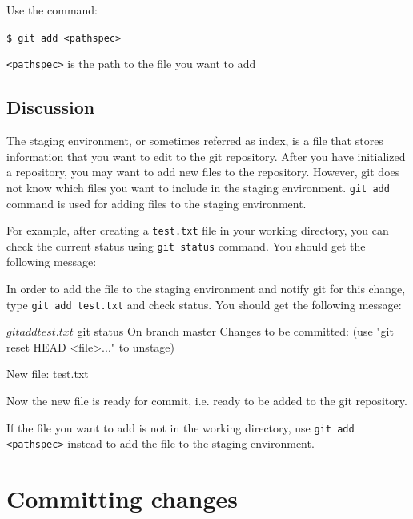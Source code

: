 \documentclass[12pt]{report}
\newcommand\code[1]{{\color{blue}\texttt{#1}}}
\begin{document}
Use the command:

\code{\$ git add <pathspec>}

\code{<pathspec>} is the path to the file you want to add

\subsection*{Discussion}

The staging environment, or sometimes referred as index, is a file that stores information that you want to edit to the git repository. After you have initialized a repository, you may want to add new files to the repository. However, git does not know which files you want to include in the staging environment. \code{git add} command is used for adding files to the staging environment.

For example, after creating a \texttt{test.txt} file in your working directory, you can check the current status using \code{git status} command. You should get the following message:


In order to add the file to the staging environment and notify git for this change, type \code{git add test.txt} and check status. You should get the following message:

\begin{blockcode}
$ git add test.txt
$ git status
On branch master
Changes to be committed:
  (use "git reset HEAD <file>..." to unstage)
  
    New file: test.txt

\end{blockcode}

Now the new file is ready for commit, i.e. ready to be added to the git repository.

If the file you want to add is not in the working directory, use \code{git add <pathspec>} instead to add the file to the staging environment.

\section{Committing changes}
\end{document}
